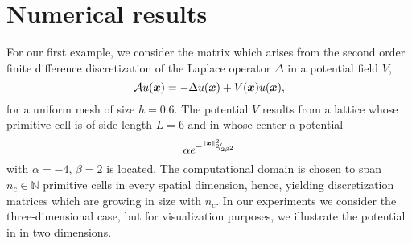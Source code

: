 \documentclass[12pt]{article}
\begin{document}

\section{Numerical results}
\label{sec:results}

For our first example, we consider the matrix which arises from the second order
finite difference discretization of the Laplace operator $\Delta$ in a potential
field $V$,
\begin{equation}
    \mathcal{A} u(\boldsymbol{x}) = - \Delta u(\boldsymbol{x}) + V(\boldsymbol{x}) u(\boldsymbol{x}),
    \label{equ:5-experiments-electronic-hamiltonian}
\end{equation}
for a uniform mesh of size $h=0.6$. The potential $V$ results from a
lattice whose primitive cell is of side-length $L=6$ and in whose center a
potential
\begin{equation}
    \alpha e^{-{}^{\lVert \boldsymbol{x} \rVert _2^2}{\mskip -5mu/\mskip -3mu}_{ 2 \beta^2 }}
    \label{equ:5-experiments-gaussian-cell}
\end{equation}
with $\alpha = -4$, $\beta = 2$ is located. The computational domain is chosen
to span $n_c \in \mathbb{N}$ primitive cells in every spatial dimension, hence, yielding
discretization matrices which are growing in size with $n_c$. In our experiments
we consider the three-dimensional case, but for visualization purposes, we
illustrate the potential in 
in two dimensions.

%        
%        
%        
\end{document}
